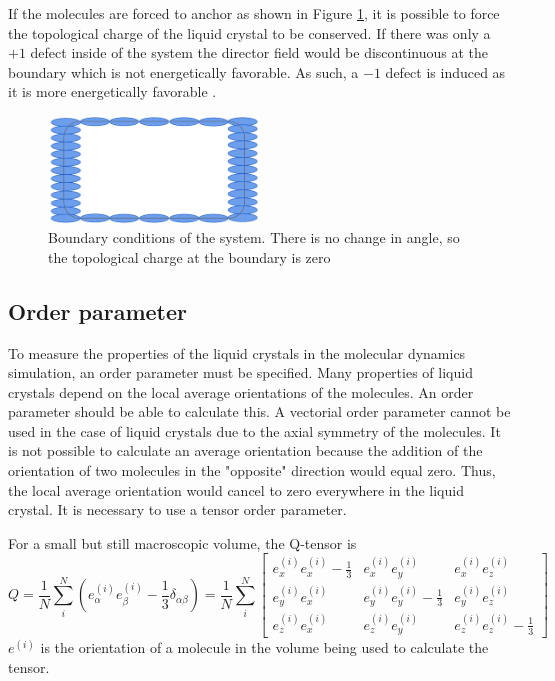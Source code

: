 \documentclass[preprint, aps]{revtex4-1}
\begin{document}
If the molecules are forced to anchor as shown in Figure \ref{fig:bc}, it is 
possible to force the topological charge of the liquid crystal to be conserved. 
If there was only a $+1$ defect inside of the system the director field would be
discontinuous at the boundary which is not energetically favorable. As such, a
$-1$ defect is induced as it is more energetically favorable \cite{stark01}.
	\begin{figure}[H]
		\centering
		\includegraphics[width=0.5\textwidth]{bc.png}
		\caption{Boundary conditions of the system. There is no change in angle,
		so the topological charge at the boundary is zero}
		\label{fig:bc}
	\end{figure}

\subsection*{Order parameter}
To measure the properties of the liquid crystals in the molecular dynamics 
simulation, an order parameter must be specified. Many properties of liquid
crystals depend on the local average orientations of the molecules. An order
parameter should be able to calculate this. A vectorial order parameter cannot 
be used in the case of liquid crystals due to the axial symmetry of the 
molecules. It is not possible to calculate an average orientation because the 
addition of the orientation of two molecules in the "opposite" direction would 
equal zero. Thus, the local average orientation would cancel to zero
everywhere in the liquid crystal. It is necessary to use a tensor order 
parameter. 

For a small but still macroscopic volume, the Q-tensor is
	\begin{equation} \label{q-tensor}
		Q = \frac{1}{N} \sum_{i}^{N} 
		(e_{\alpha}^{(i)} e_{\beta}^{(i)} - \frac{1}{3}\delta_{\alpha\beta})
		= \frac{1}{N} \sum_{i}^{N}
		\begin{bmatrix}
			e_x^{(i)}e_x^{(i)} - \frac{1}{3} 
			& e_x^{(i)}e_y^{(i)} 
			& e_x^{(i)}e_z^{(i)} \\

			e_y^{(i)}e_x^{(i)} 
			& e_y^{(i)}e_y^{(i)} - \frac{1}{3} 
			& e_y^{(i)}e_z^{(i)} \\

			e_z^{(i)}e_x^{(i)} 
			& e_z^{(i)}e_y^{(i)} 
			& e_z^{(i)}e_z^{(i)} - \frac{1}{3}
		\end{bmatrix}
	\end{equation}
$e^{(i)}$ is the orientation of a molecule in the volume being used to calculate
the tensor. 
\end{document}
